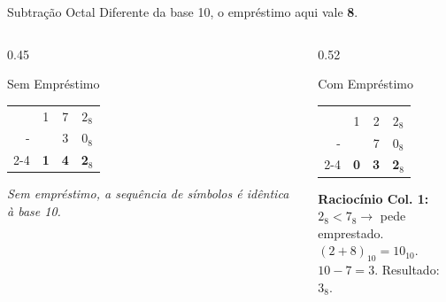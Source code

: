\begin{frame}{Subtração Octal}
    Diferente da base 10, o empréstimo aqui vale \textbf{8}.

    \begin{columns}
        \begin{column}{0.45\textwidth}
            \begin{exampleblock}{Sem Empréstimo}
                \centering
                \begin{tabular}{r ccc}
                      & 1          & 7          & $2_8$          \\
                    - &            & 3          & $0_8$          \\ \cline{2-4}
                      & \textbf{1} & \textbf{4} & \textbf{2$_8$} \\
                \end{tabular}
            \end{exampleblock}
            \small \textit{Sem empréstimo, a sequência de símbolos é idêntica à base 10.}
        \end{column}

        \begin{column}{0.52\textwidth}
            \begin{exampleblock}{Com Empréstimo}
                \centering
                \begin{tabular}{r ccc}
                    \color{red}{\footnotesize (emprestado)} & \color{red}{-1} & \color{red}{+$10_8$} &                \\
                                                            & 1               & 2                    & $2_8$          \\
                    -                                       &                 & 7                    & $0_8$          \\ \cline{2-4}
                                                            & \textbf{0}      & \textbf{3}           & \textbf{2$_8$} \\
                \end{tabular}
            \end{exampleblock}
            \footnotesize
            \textbf{Raciocínio Col. 1:} \\
            $2_8 < 7_8 \rightarrow$ pede emprestado. \\
            $(2 + 8)_{10} = 10_{10}$. \\
            $10 - 7 = 3$. Resultado: \textbf{$3_8$}.
        \end{column}
    \end{columns}
\end{frame}

